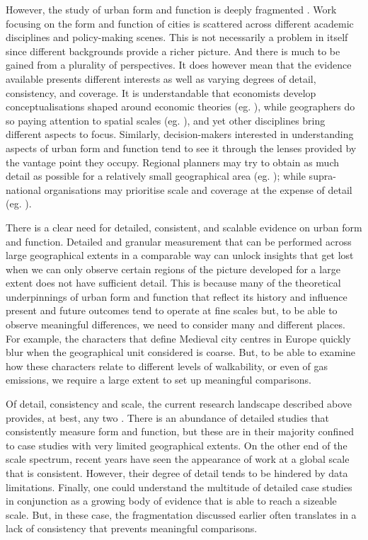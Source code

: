 However, the study of urban form and function is deeply fragmented
\citep{kropf2014ambiguity,brenner2015towards,gauthier2006mapping}.
Work focusing on the form and function of cities is scattered across
different academic disciplines and policy-making scenes. This is not
necessarily a problem in itself since different backgrounds
provide a richer picture. And there is much to be gained from a plurality of
perspectives.
%
It does however mean that the evidence available presents different
interests as well as varying degrees of detail, consistency, and coverage.
It is understandable that economists develop conceptualisations shaped around
economic theories (eg. \citealp{ahlfeldt2019}), while geographers do so paying attention
to spatial scales (eg. \citealp{boeing2018}),
and yet other disciplines bring different aspects to focus.
Similarly, decision-makers interested in understanding aspects of urban form
and function tend to see it through the lenses provided by the vantage point
they occupy. Regional planners may try to obtain as much detail as
possible for a relatively small geographical area (eg. \citealp{bcnnight});
while supra-national organisations may prioritise scale and coverage
at the expense of detail (eg. \citealp{eea2016}).

There is a clear need for detailed, consistent, and scalable evidence on urban
form and function.
Detailed and granular measurement that can be performed across large
geographical extents in a comparable way can unlock insights that get lost
when we can only observe certain regions of the picture developed for a large
extent does not have sufficient detail.
%
This is because many of the
theoretical underpinnings of urban form and function that reflect its history
and influence present and future outcomes tend to operate at fine scales but,
to be able to observe meaningful differences, we need to consider many and
different places.
%
For example, the characters that define Medieval city centres in Europe
quickly blur when the geographical unit considered is coarse. But, to be able to
examine how these characters relate to different levels of walkability, or
even of gas emissions, we require a large extent to set up meaningful
comparisons.

Of detail, consistency and scale, the current research landscape described above
provides, at best, any two \citep{jochem2020,araldi2019,fleischmann2021methodological}.
%
There is an abundance of detailed studies that consistently measure form and
function, but these are in their majority confined to case studies with very
limited geographical extents.
%
On the other end of the scale spectrum, recent years have seen the appearance
of work at a global scale that is consistent. However, their degree of detail
tends to be hindered by data limitations.
%
Finally, one could understand the multitude of detailed case studies in
conjunction as a growing body of evidence that is able to reach a sizeable
scale. But, in these case, the fragmentation discussed earlier often
translates in a lack of consistency that prevents meaningful comparisons.

